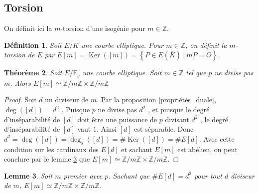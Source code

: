 \documentclass{article}
\theoremstyle{plain}%
\newtheorem{thm}{Théorème}[section]
\newtheorem{deff}[thm]{Définition}
\newtheorem{lem}[thm]{Lemme}
\theoremstyle{definition}%
\newcommand{\F}{\mathbb{F}}
\newcommand{\Z}{\mathbb{Z}}
\DeclareMathOperator{\Ker}{Ker}
\begin{document}
\subsection{Torsion}

On définit ici la $m$-torsion d'une isogénie pour $m\in\Z$.

\begin{deff}
  Soit $E/K$ une courbe elliptique. Pour $m\in\Z$, on définit la $m$-torsion de $E$ par $ E[m] = \Ker([m])= \left\{ P\in E(\overline{K}) \ \vert\  mP = O \right\}$.
\end{deff}

\begin{thm}
  \label{structure_torsion}
  Soit $E/\F_q$ une courbe elliptique. Soit $m\in \Z$ tel que $p$ ne divise pas $m$. Alors $E[m] \simeq {\Z}/{m\Z} \times  {\Z}/{m\Z}$
\end{thm}

\begin{proof}
Soit $d$ un diviseur de $m$. 
Par la proposition \ref{propriétés_duale}, $\deg([d]) = d^2$ . Puisque $p$ ne divise pas $d^2$ , et puisque le degré d'inséparabilité de $[d]$ doit être une puissance de $p$ divisant $d^2$ , le degré d'inséparabilité de $[d]$ vaut $1$. Ainsi $[d]$ est séparable. Donc $d^2 = \deg([d]) = \deg_s([d]) = \#\Ker([d]) = \#E[d]$. 
Avec cette condition sur les cardinaux des $E[d]$ et sachant $E[m]$ est abélien, on peut conclure par le lemme \ref{groupes_abéliens} que $E[m] \simeq {\Z}/{m\Z} \times  {\Z}/{m\Z}$.
\end{proof}

\begin{lem}
  \label{groupes_abéliens}
  Soit $m$ premier avec $p$. Sachant que $\#E[d]=d^2$ pour tout $d$ diviseur de $m$, $E[m] \simeq {\Z}/{m\Z} \times  {\Z}/{m\Z}$. 
\end{lem}
\end{document}
